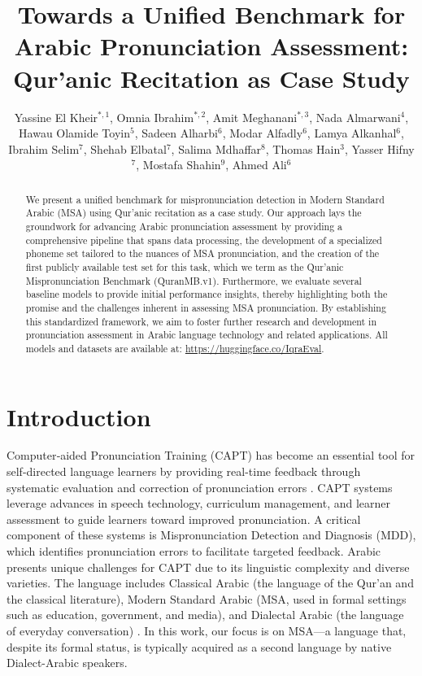 \documentclass{Interspeech}
\title{Towards a Unified Benchmark for Arabic Pronunciation Assessment: Qur’anic Recitation as Case Study}
\author[]{%
  Yassine El Kheir$^{*,1}$, 
  Omnia Ibrahim$^{*,2}$, 
  Amit Meghanani$^{*,3}$, 
  Nada Almarwani$^{4}$, 
  Hawau Olamide Toyin$^{5}$, 
  Sadeen Alharbi$^{6}$, 
  Modar Alfadly$^{6}$, 
  Lamya Alkanhal$^{6}$, 
  Ibrahim Selim$^{7}$, 
  Shehab Elbatal$^{7}$, 
  Salima Mdhaffar$^{8}$, 
  Thomas Hain$^{3}$, 
  Yasser Hifny$^{7}$, 
  Mostafa Shahin$^{9}$, 
  Ahmed Ali$^{6}$
}
\affiliation{}{%
  DFKI;  
  $^2$Alexandria Univ.;  
  $^3$Univ. of Sheffield;  
  $^4$Taibah Univ.;  
  $^5$MBZUAI;  
  $^6$SDAIA;  
  $^7$Helwan Univ.;  
  $^8$Univ. of Avignon;  
  $^9$Univ. of New South Wales
}{}
\begin{document}
\maketitle


\begin{abstract} We present a unified benchmark for mispronunciation detection in Modern Standard Arabic (MSA) using Qur'anic recitation as a case study. Our approach lays the groundwork for advancing Arabic pronunciation assessment by providing a comprehensive pipeline that spans data processing, the development of a specialized phoneme set tailored to the nuances of MSA pronunciation, and the creation of the first publicly available test set for this task, which we term as the Qur'anic Mispronunciation Benchmark (QuranMB.v1). Furthermore, we evaluate several baseline models to provide initial performance insights, thereby highlighting both the promise and the challenges inherent in assessing MSA pronunciation. By establishing this standardized framework, we aim to foster further research and development in pronunciation assessment in Arabic language technology and related applications. All models and datasets are available at: \url{https://huggingface.co/IqraEval}.


\end{abstract}


\section{Introduction}

Computer‐aided Pronunciation Training (CAPT) has become an essential tool for self-directed language learners by providing real-time feedback through systematic evaluation and correction of pronunciation errors \cite{neri2008effectiveness}. CAPT systems leverage advances in speech technology, curriculum management, and learner assessment to guide learners toward improved pronunciation. A critical component of these systems is Mispronunciation Detection and Diagnosis (MDD), which identifies pronunciation errors to facilitate targeted feedback.
Arabic presents unique challenges for CAPT due to its linguistic complexity and diverse varieties. The language includes Classical Arabic (the language of the Qur'an and the classical literature), Modern Standard Arabic (MSA, used in formal settings such as education, government, and media), and Dialectal Arabic (the language of everyday conversation) \cite{kheir2024beyond}. In this work, our focus is on MSA—a language that, despite its formal status, is typically acquired as a second language by native Dialect-Arabic speakers.
\end{document}
